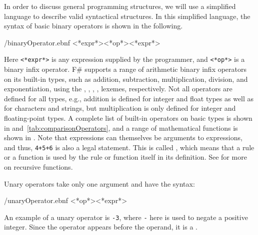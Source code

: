 In order to discuss general programming structures, we will use a simplified language to describe valid syntactical structures. In this simplified language, the syntax of basic binary operators is shown in the following.
%
\begin{verbatimwrite}{\ebnf/binaryOperator.ebnf}
<*expr*><*op*><*expr*>
\end{verbatimwrite}
%
Here \lstinline[language=syntax]{<*expr*>} is any expression supplied by the programmer, and \lstinline[language=syntax]{<*op*>} is a binary infix operator. F\# supports a range of arithmetic binary infix operators on its built-in types, such as addition, subtraction, multiplication, division, and exponentiation, using the \lexeme{+}, \lexeme{-}, \lexeme{*}, \lexeme{/}, \lexeme{**} lexemes, respectively. Not all operators are defined for all types, e.g., addition is defined for integer and float types as well as for characters and strings, but multiplication is only defined for integer and floating-point types. A complete list of built-in operators on basic types is shown in  and~\ref{tab:comparisonOperators}, and a range of mathematical functions is shown in . Note that expressions can themselves be arguments to expressions, and thus, \lstinline!4+5+6! is also a legal statement. This is called , which means that a rule or a function is used by the rule or function itself in its definition. See  for more on recursive functions.

Unary operators take only one argument and have the syntax:
%
\begin{verbatimwrite}{\ebnf/unaryOperator.ebnf}
<*op*><*expr*>
\end{verbatimwrite}
%
An example of a unary operator is \lstinline!-3!, where \lstinline!-! here is used to negate a positive integer. Since the operator appears before the operand, it is a . 

